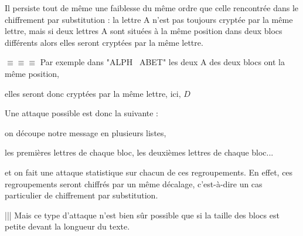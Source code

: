 \change

Il persiste tout de même une faiblesse du même ordre que celle rencontrée dans le chiffrement par substitution : la lettre A
n'est pas toujours cryptée par la même lettre, mais si deux lettres A sont situées à la même position dans deux blocs différents 
alors elles seront cryptées par la même lettre.

\change 
$\equiv \equiv \equiv $ 
Par exemple dans "ALPH \ ABET" les deux A des deux blocs ont la même position, 

\change

elles seront donc cryptées par la même lettre, ici, $D$

\change


Une attaque possible est donc la suivante : 

\change

on découpe notre message en plusieurs listes,

\change


les premières lettres de chaque bloc, les deuxièmes lettres de chaque bloc...

\change


et on fait une attaque statistique sur chacun de ces regroupements. En effet, ces regroupements seront chiffrés par un même décalage, c'est-à-dire un cas particulier de chiffrement par substitution.

\change

||| Mais ce type d'attaque n'est bien s\^ur possible que si la taille des blocs 
est petite devant la longueur du texte.



